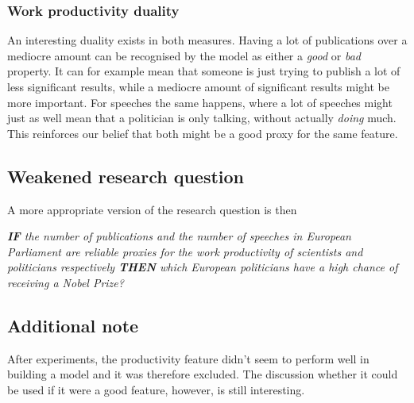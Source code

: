 \subsubsection{Work productivity duality}
An interesting duality exists in both measures. Having a lot of publications over a mediocre amount can be recognised by the model as either a \emph{good} or \emph{bad} property. It can for example mean that someone is just trying to publish a lot of less significant results, while a mediocre amount of significant results might be more important. For speeches the same happens, where a lot of speeches might just as well mean that a politician is only talking, without actually \emph{doing} much. This reinforces our belief that both might be a good proxy for the same feature.

\subsection{Weakened research question}
A more appropriate version of the research question is then
\begin{center}
	\emph{\textbf{\textsc{IF}} the number of publications and the number of speeches in European Parliament are reliable proxies for the work productivity of scientists and politicians respectively \textbf{\textsc{THEN}} which European politicians have a high chance of receiving a Nobel Prize?}
\end{center}

\subsection{Additional note}
After experiments, the productivity feature didn't seem to perform well in building a model and it was therefore excluded. The discussion whether it could be used if it were a good feature, however, is still interesting.
